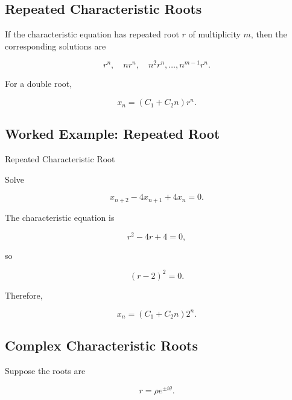 \subsection{Repeated Characteristic Roots}
\label{subsec:difference-repeated-roots}

If the characteristic equation has repeated root \(r\) of multiplicity
\(m\), then the corresponding solutions are

\[
\boxed{
r^n,
\quad
nr^n,
\quad
n^2r^n,
\ldots,
n^{m-1}r^n.
}
\]

For a double root,

\[
\boxed{
x_n
=
(C_1+C_2n)r^n.
}
\]

\subsection{Worked Example: Repeated Root}
\label{subsec:worked-difference-repeated-root}

\begin{workedexamplebox}{Repeated Characteristic Root}

Solve

\[
x_{n+2}
-
4x_{n+1}
+
4x_n
=
0.
\]

The characteristic equation is

\[
r^2-4r+4=0,
\]

so

\[
(r-2)^2=0.
\]

Therefore,

\begin{answerbox}
\[
\boxed{
x_n
=
(C_1+C_2n)2^n.
}
\]
\end{answerbox}

\end{workedexamplebox}

\subsection{Complex Characteristic Roots}
\label{subsec:difference-complex-roots}

Suppose the roots are

\[
\boxed{
r
=
\rho e^{\pm i\theta}.
}
\]

